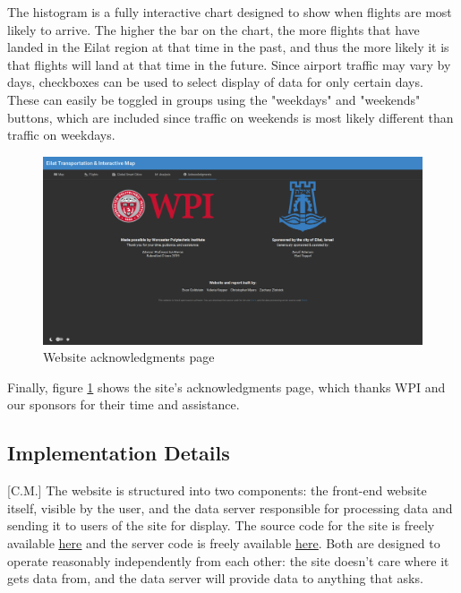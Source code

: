 \documentclass[12pt]{article}                       %
\begin{document}
The histogram is a fully interactive chart designed to show when flights are most likely to arrive. The higher the bar on the chart, the more flights that have landed in the Eilat region at that time in the past, and thus the more likely it is that flights will land at that time in the future. Since airport traffic may vary by days, checkboxes can be used to select display of data for only certain days. These can easily be toggled in groups using the "weekdays" and "weekends" buttons, which are included since traffic on weekends is most likely different than traffic on weekdays.

\begin{figure}[H]
    \centering
    \includegraphics[width=13cm]{images/site_about.png}
    \caption{Website acknowledgments page}
    \label{img:site_about}
\end{figure}

Finally, figure \ref{img:site_about} shows the site's acknowledgments page, which thanks WPI and our sponsors for their time and assistance.

\subsection{Implementation Details}[C.M.]
The website is structured into two components: the front-end website itself, visible by the user, and the data server responsible for processing data and sending it to users of the site for display. The source code for the site is freely available \underline{\href{https://github.com/c7c8/Eilat-Transport-Map-Site}{here}} and the server code is freely available \underline{\href{https://github.com/c7c8/Eilat-Transport-Map-Server}{here}}. Both are designed to operate reasonably independently from each other: the site doesn't care where it gets data from, and the data server will provide data to anything that asks.
\end{document}
